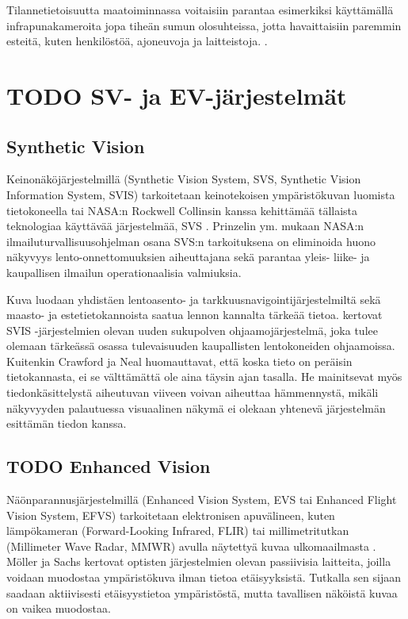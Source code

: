 \documentclass[utf8,bachelor,manualbib]{gradu3}
\begin{document}
Tilannetietoisuutta maatoiminnassa voitaisiin parantaa esimerkiksi käyttämällä infrapunakameroita jopa tiheän sumun olosuhteissa, jotta havaittaisiin paremmin esteitä, kuten henkilöstöä, ajoneuvoja ja laitteistoja. \citep{beiergemperlein2004}.













\chapter{TODO SV- ja EV-järjestelmät}

\section{Synthetic Vision}

Keinonäköjärjestelmillä (Synthetic Vision System, SVS, Synthetic Vision Information System, SVIS) tarkoitetaan keinotekoisen ympäristökuvan luomista  tietokoneella \citep{baileyym2007} tai NASA:n Rockwell Collinsin kanssa kehittämää tällaista teknologiaa käyttävää järjestelmää, SVS \citep{crawfordneal2006}. Prinzelin ym. \citeyearpar{prinzel2004} mukaan NASA:n ilmailuturvallisuusohjelman osana SVS:n tarkoituksena on eliminoida huono näkyvyys lento-onnettomuuksien aiheuttajana sekä parantaa yleis- liike- ja kaupallisen ilmailun operationaalisia valmiuksia.

Kuva luodaan yhdistäen lentoasento- ja tarkkuusnavigointijärjestelmiltä sekä maasto- ja estetietokannoista saatua lennon kannalta tärkeää tietoa. \cite{schnellym2004} kertovat SVIS -järjestelmien olevan uuden sukupolven ohjaamojärjestelmä, joka tulee olemaan tärkeässä osassa tulevaisuuden kaupallisten lentokoneiden ohjaamoissa. Kuitenkin Crawford ja Neal \citeyearpar{crawfordneal2006} huomauttavat, että koska tieto on peräisin tietokannasta, ei se välttämättä ole aina täysin ajan tasalla. He mainitsevat myös tiedonkäsittelystä aiheutuvan viiveen voivan aiheuttaa hämmennystä, mikäli näkyvyyden palautuessa visuaalinen näkymä ei olekaan yhtenevä järjestelmän esittämän tiedon kanssa.

\section{TODO Enhanced Vision}

Näönparannusjärjestelmillä (Enhanced Vision System, EVS tai Enhanced Flight Vision System, EFVS) tarkoitetaan elektronisen apuvälineen, kuten lämpökameran (Forward-Looking Infrared, FLIR) tai millimetritutkan (Millimeter Wave Radar, MMWR) avulla näytettyä kuvaa ulkomaailmasta \citep{baileyym2007}. Möller ja Sachs \citeyearpar{mollersachs1994} kertovat optisten järjestelmien olevan passiivisia laitteita, joilla voidaan muodostaa ympäristökuva ilman tietoa etäisyyksistä. Tutkalla sen sijaan saadaan aktiivisesti etäisyystietoa ympäristöstä, mutta tavallisen näköistä kuvaa on vaikea muodostaa.
\end{document}

